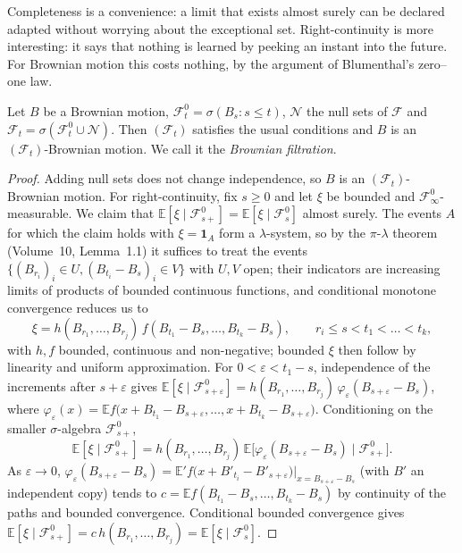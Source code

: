 Completeness is a convenience: a limit that exists almost surely can be declared adapted without worrying about the exceptional set. Right-continuity is more interesting: it says that
nothing is learned by peeking an instant into the future. For Brownian motion this costs nothing, by the argument of Blumenthal's zero--one law.

\begin{proposition}\label{prop:brownfilt}
Let $B$ be a Brownian motion, $\mathcal F^0_t=\sigma(B_s:s\le t)$, $\mathcal N$ the null sets of $\mathcal F$ and $\mathcal F_t=\sigma(\mathcal F^0_t\cup\mathcal N)$. Then $(\mathcal F_t)$ satisfies the usual conditions and
$B$ is an $(\mathcal F_t)$-Brownian motion. We call it the \emph{Brownian filtration}.
\end{proposition}

\begin{proof}
Adding null sets does not change independence, so $B$ is an $(\mathcal F_t)$-Brownian motion. For right-continuity, fix $s\ge0$ and let $\xi$ be bounded and $\mathcal F^0_\infty$-measurable. We claim
that $\mathbb E[\xi\mid\mathcal F^0_{s+}]=\mathbb E[\xi\mid\mathcal F^0_s]$ almost surely. The events $A$ for which the claim holds with $\xi=\mathbf 1_A$ form a $\lambda$-system, so by the $\pi$-$\lambda$ theorem (Volume~10, Lemma~1.1) it suffices to treat the events
$\{(B_{r_i})_i\in U,(B_{t_i}-B_s)_i\in V\}$ with $U,V$ open; their indicators are increasing limits of products of bounded continuous functions, and conditional monotone convergence reduces us to
\[
\xi=h(B_{r_1},\dots,B_{r_j})\,f(B_{t_1}-B_s,\dots,B_{t_k}-B_s),\qquad r_i\le s<t_1<\dots<t_k,
\]
with $h,f$ bounded, continuous and non-negative; bounded $\xi$ then follow by linearity and uniform approximation. For $0<\varepsilon<t_1-s$, independence of the increments after $s+\varepsilon$ gives
$\mathbb E[\xi\mid\mathcal F^0_{s+\varepsilon}]=h(B_{r_1},\dots,B_{r_j})\,\varphi_\varepsilon(B_{s+\varepsilon}-B_s)$, where $\varphi_\varepsilon(x)=\mathbb E f\bigl(x+B_{t_1}-B_{s+\varepsilon},\dots,x+B_{t_k}-B_{s+\varepsilon}\bigr)$.
Conditioning on the smaller $\sigma$-algebra $\mathcal F^0_{s+}$,
\[
\mathbb E[\xi\mid\mathcal F^0_{s+}]=h(B_{r_1},\dots,B_{r_j})\,\mathbb E\bigl[\varphi_\varepsilon(B_{s+\varepsilon}-B_s)\mid\mathcal F^0_{s+}\bigr].
\]
As $\varepsilon\to0$, $\varphi_\varepsilon(B_{s+\varepsilon}-B_s)=\mathbb E'f\bigl(x+B'_{t_i}-B'_{s+\varepsilon}\bigr)|_{x=B_{s+\varepsilon}-B_s}$ (with $B'$ an independent copy) tends to $c=\mathbb Ef(B_{t_1}-B_s,\dots,B_{t_k}-B_s)$
by continuity of the paths and bounded convergence. Conditional bounded convergence gives $\mathbb E[\xi\mid\mathcal F^0_{s+}]=c\,h(B_{r_1},\dots,B_{r_j})=\mathbb E[\xi\mid\mathcal F^0_s]$.


\end{proof}
